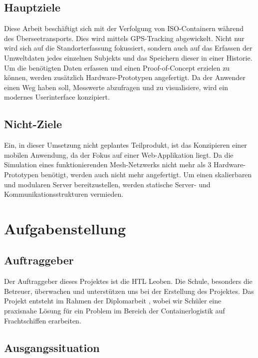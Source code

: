 \documentclass[
    headings=optiontotocandhead,%
    twoside,
    numbers=noenddot,%
    12pt, %
    titlepage, %
    parskip=full, %
    listof=leveldown, 
    numbers=noenddot, %
    a4paper,DIV=14,
    BCOR=15mm,
]{scrbook}
\makeatletter
\newcommand*{\the@orig@section}{}
\let\the@orig@section\section
\renewcommand*{\section}{%
  \clearpage
  \the@orig@section
}
\makeatother
\begin{document}
\hypertarget{hauptziele}{%
\subsection{Hauptziele}\label{hauptziele}}

Diese Arbeit beschäftigt sich mit der Verfolgung von ISO-Containern
während des Überseetransports. Dies wird mittels GPS-Tracking
abgewickelt. Nicht nur wird sich auf die Standorterfassung fokussiert,
sondern auch auf das Erfassen der Umweltdaten jedes einzelnen Subjekts
und das Speichern dieser in einer Historie. Um die benötigten Daten
erfassen und einen Proof-of-Concept erzielen zu können, werden
zusätzlich Hardware-Prototypen angefertigt. Da der Anwender einen Weg
haben soll, Messwerte abzufragen und zu visualisiere, wird ein modernes
Userinterface konzipiert.

\hypertarget{nicht-ziele}{%
\subsection{Nicht-Ziele}\label{nicht-ziele}}

Ein, in dieser Umsetzung nicht geplantes Teilprodukt, ist das
Konzipieren einer mobilen Anwendung, da der Fokus auf einer
Web-Applikation liegt. Da die Simulation eines funktionierenden
Mesh-Netzwerks nicht mehr als 3 Hardware-Prototypen benötigt, werden
auch nicht mehr angefertigt. Um einen skalierbaren und modularen Server
bereitzustellen, werden statische Server- und Kommunikationsstrukturen
vermieden.

\hypertarget{aufgabenstellung}{%
\section{Aufgabenstellung}\label{aufgabenstellung}}

\hypertarget{auftraggeber}{%
\subsection{Auftraggeber}\label{auftraggeber}}

Der Auftraggeber dieses Projektes ist die HTL Leoben. Die Schule,
besonders die Betreuer, überwachen und unterstützen uns bei der
Erstellung des Projektes. Das Projekt entsteht im Rahmen der
Diplomarbeit , wobei wir Schüler eine praxisnahe Lösung für ein Problem
im Bereich der Containerlogistik auf Frachtschiffen erarbeiten.

\hypertarget{ausgangssituation}{%
\subsection{Ausgangssituation}\label{ausgangssituation}}
\end{document}
